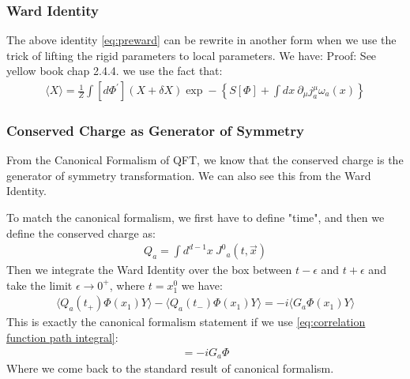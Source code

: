 \subsubsection{Ward Identity}

The above identity \cref{eq:preward} can be rewrite in another form
when we use the trick of lifting the rigid parameters to local
parameters. We have:
Proof: See yellow book chap 2.4.4. we use the fact that:
\begin{align}
  \langle X\rangle=\frac{1}{Z}\int[d\Phi^{\prime}]\left(X+\delta
  X\right)\exp-\left\{S[\Phi]+\int dx\mathrm{~}\partial_\mu
  j_a^\mu\omega_a(x)\right\}
\end{align}

\subsubsection{Conserved Charge as Generator of Symmetry}

From the Canonical Formalism of QFT, we know that the conserved
charge is the generator of symmetry transformation. We can also see
this from the Ward Identity.

To match the canonical formalism, we first have to define "time", and
then we define the conserved charge as:
\begin{align}
  Q_a = \int d^{d-1}x\ J^0{}_a(t,\vec{x})
\end{align}
Then we integrate the Ward Identity over the box between $ t-\epsilon
$ and $ t+\epsilon $ and take the limit $ \epsilon\to 0^+ $, where $
t = x_1^0 $ we have:
\begin{align}
  \langle Q_a(t_+)\Phi(x_1)Y\rangle-\langle
  Q_a(t_-)\Phi(x_1)Y\rangle=-i\langle G_a\Phi(x_1)Y\rangle
\end{align}
This is exactly the canonical formalism statement if we use
\cref{eq:correlation function path integral}:
\begin{align}
  [Q_a,\Phi]=-iG_a\Phi
\end{align}
Where we come back to the standard result of canonical formalism.
